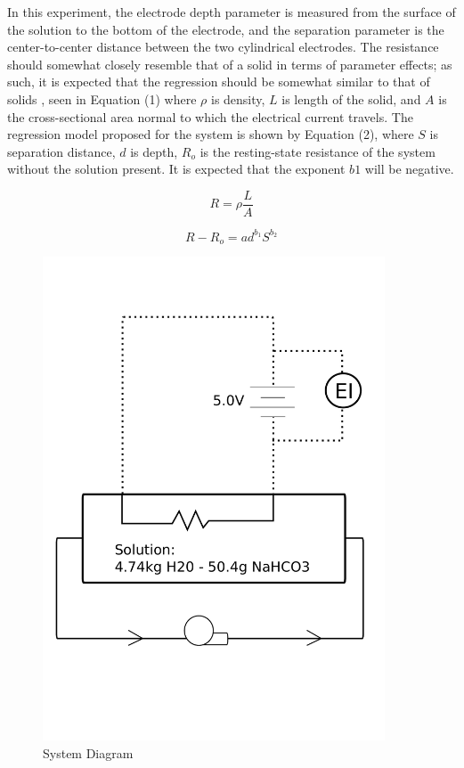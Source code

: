 \documentclass[12pt]{article}
\begin{document}
In this experiment, the electrode depth parameter is measured from the surface of the solution to the bottom of the electrode, and the separation parameter is the center-to-center distance between the two cylindrical electrodes. The resistance should somewhat closely resemble that of a solid in terms of parameter effects; as such, it is expected that the regression should be somewhat similar to that of solids \cite{physics_book}, seen in Equation (1) where $\rho$ is density, $L$ is length of the solid, and $A$ is the cross-sectional area normal to which the electrical current travels. The regression model proposed for the system is shown by Equation (2), where $S$ is separation distance, $d$ is depth, $R_o$ is the resting-state resistance of the system without the solution present. It is expected that the exponent $b1$ will be negative.
\bigskip

\begin{equation}
R = \rho\frac{L}{A}
\end{equation}

\begin{equation}
R-R_o = ad^{b_1}S^{b_2}
\end{equation}


\newpage

\begin{figure}[t!] %
   \centering
   \includegraphics[width=4in]{system_diagram.pdf} 
   \caption{System Diagram}
   \label{fig:example}
\end{figure}
\end{document}
